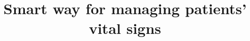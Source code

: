 \documentclass{bmcart}
\begin{document}
\begin{frontmatter}

\begin{fmbox}


\title{Smart way for managing patients' vital signs}


\author[ addressref={aff1},
   corref={aff1},                       %
   noteref={n1},                        %
   email={jane.e.doe@cambridge.co.uk}   %
]{ } \author[ addressref={aff1,aff2},
email={john.RS.Smith@cambridge.co.uk} ]{ }


\address[id=aff1]{%
  , %
  ,                     %
  ,                              %
} \address[id=aff2]{%
  ,
  ,
  ,
}


\end{fmbox}
\end{frontmatter}
\end{document}
